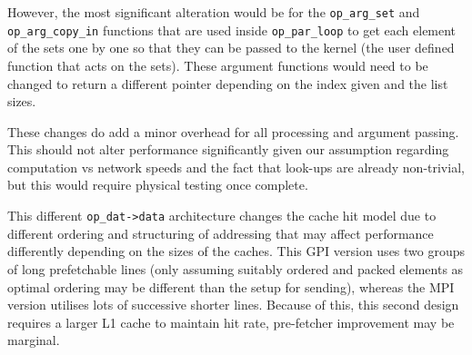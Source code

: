 However, the most significant alteration would be for the \texttt{op\_arg\_set} and \texttt{op\_arg\_copy\_in} functions that are used inside \texttt{op\_par\_loop} to get each element of the sets one by one so that they can be passed to the kernel (the user defined function that acts on the sets). These argument functions would need to be changed to return a different pointer depending on the index given and the list sizes.

These changes do add a minor overhead for all processing and argument passing. This should not alter performance significantly given our assumption regarding computation vs network speeds and the fact that look-ups are already non-trivial, but this would require physical testing once complete. 

This different \texttt{op\_dat->data} architecture changes the cache hit model due to different ordering and structuring of addressing that may affect performance differently depending on the sizes of the caches. This GPI version uses two groups of long prefetchable lines (only assuming suitably ordered and packed elements as optimal ordering may be different than the setup for sending), whereas the MPI version utilises lots of successive shorter lines. Because of this, this second design requires a larger L1 cache to maintain hit rate,  pre-fetcher improvement may be marginal. 